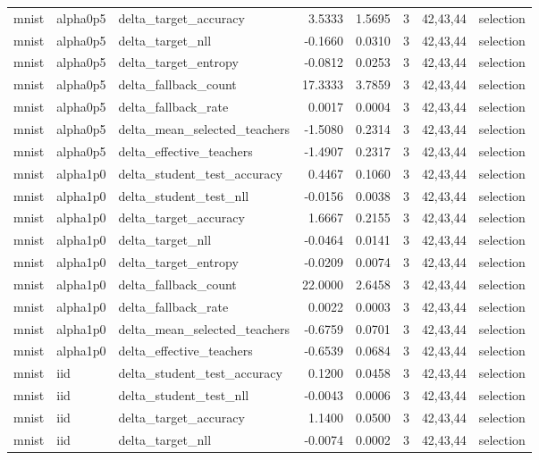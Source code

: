 \begin{tabular}{lllrrrll}
mnist & alpha0p5 & delta\_target\_accuracy & 3.5333 & 1.5695 & 3 & 42,43,44 & selection \\
mnist & alpha0p5 & delta\_target\_nll & -0.1660 & 0.0310 & 3 & 42,43,44 & selection \\
mnist & alpha0p5 & delta\_target\_entropy & -0.0812 & 0.0253 & 3 & 42,43,44 & selection \\
mnist & alpha0p5 & delta\_fallback\_count & 17.3333 & 3.7859 & 3 & 42,43,44 & selection \\
mnist & alpha0p5 & delta\_fallback\_rate & 0.0017 & 0.0004 & 3 & 42,43,44 & selection \\
mnist & alpha0p5 & delta\_mean\_selected\_teachers & -1.5080 & 0.2314 & 3 & 42,43,44 & selection \\
mnist & alpha0p5 & delta\_effective\_teachers & -1.4907 & 0.2317 & 3 & 42,43,44 & selection \\
mnist & alpha1p0 & delta\_student\_test\_accuracy & 0.4467 & 0.1060 & 3 & 42,43,44 & selection \\
mnist & alpha1p0 & delta\_student\_test\_nll & -0.0156 & 0.0038 & 3 & 42,43,44 & selection \\
mnist & alpha1p0 & delta\_target\_accuracy & 1.6667 & 0.2155 & 3 & 42,43,44 & selection \\
mnist & alpha1p0 & delta\_target\_nll & -0.0464 & 0.0141 & 3 & 42,43,44 & selection \\
mnist & alpha1p0 & delta\_target\_entropy & -0.0209 & 0.0074 & 3 & 42,43,44 & selection \\
mnist & alpha1p0 & delta\_fallback\_count & 22.0000 & 2.6458 & 3 & 42,43,44 & selection \\
mnist & alpha1p0 & delta\_fallback\_rate & 0.0022 & 0.0003 & 3 & 42,43,44 & selection \\
mnist & alpha1p0 & delta\_mean\_selected\_teachers & -0.6759 & 0.0701 & 3 & 42,43,44 & selection \\
mnist & alpha1p0 & delta\_effective\_teachers & -0.6539 & 0.0684 & 3 & 42,43,44 & selection \\
mnist & iid & delta\_student\_test\_accuracy & 0.1200 & 0.0458 & 3 & 42,43,44 & selection \\
mnist & iid & delta\_student\_test\_nll & -0.0043 & 0.0006 & 3 & 42,43,44 & selection \\
mnist & iid & delta\_target\_accuracy & 1.1400 & 0.0500 & 3 & 42,43,44 & selection \\
mnist & iid & delta\_target\_nll & -0.0074 & 0.0002 & 3 & 42,43,44 & selection \\

\end{tabular}
